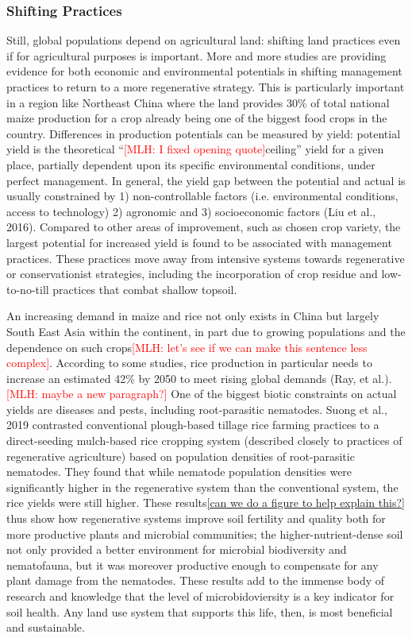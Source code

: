 \documentclass{book}\usepackage{knitr}
\newcommand{\red}[1]{\textcolor{red}{[MLH: #1]}}
\begin{document}
\subsubsection{Shifting Practices}
Still, global populations depend on agricultural land: shifting land practices even if for agricultural purposes is important. More and more studies are providing evidence for both economic and environmental potentials in shifting management practices to return to a more regenerative strategy. This is particularly important in a region like Northeast China where the land provides 30\% of total national maize production for a crop already being one of the biggest food crops in the country. Differences in production potentials can be measured by yield: potential yield is the theoretical ``\red{I fixed opening quote}ceiling” yield for a given place, partially dependent upon its specific environmental conditions, under perfect management. In general, the yield gap between the potential and actual is usually constrained by 1) non-controllable factors (i.e. environmental conditions, access to technology) 2) agronomic and 3) socioeconomic factors (Liu et al., 2016). Compared to other areas of improvement, such as chosen crop variety, the largest potential for increased yield is found to be associated with management practices. These practices move away from intensive systems towards regenerative or conservationist strategies, including the incorporation of crop residue and low-to-no-till practices that combat shallow topsoil.

An increasing demand in maize and rice not only exists  in China but largely South East Asia within the continent, in part due to growing populations and the dependence on such crops\red{let's see if we can make this sentence less complex}. According to some studies, rice production in particular needs to increase an estimated 42\% by 2050 to meet rising global demands (Ray, et al.). \red{maybe a new paragraph?} One of the biggest biotic constraints on actual yields are diseases and pests, including root-parasitic nematodes. Suong et al., 2019 contrasted conventional plough-based tillage rice farming practices to a direct-seeding mulch-based rice cropping system (described closely to practices of regenerative agriculture) based on population densities of root-parasitic nematodes. They found that while nematode population densities were significantly higher in the regenerative system than the conventional system, the rice yields were still higher. These results\ref{can we do a figure to help explain this?} thus show how regenerative systems improve soil fertility and quality both for more productive plants and microbial communities; the higher-nutrient-dense soil not only provided a better environment for microbial biodiversity and nematofauna, but it was moreover productive enough to compensate for any plant damage from the nematodes. These results add to the immense body of research and knowledge that the level of microbidoviersity is a key indicator for soil health. Any land use system that supports this life, then, is most beneficial and sustainable.
\end{document}

